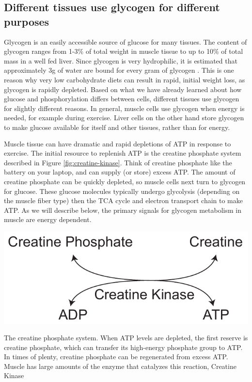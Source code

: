 \documentclass{tufte-handout}
\begin{document}
\subsection{Different tissues use glycogen for different purposes}

Glycogen is an easily accessible source of glucose for many tissues.  The content of glycogen ranges from 1-3\% of total weight in muscle tissue to up to 10\% of total mass in a well fed liver.  Since glycogen is very hydrophilic, it is estimated that approximately 3g of water are bound for every gram of glycogen \citep{Olsson1970,Fernandez-Elias2015}.  This is one reason why very low carbohydrate diets can result in rapid, initial weight loss, as glycogen is rapidly depleted. Based on what we have already learned about how glucose and phosphorylation differs between cells, different tissues use glycogen for slightly different reasons.  In general, muscle cells use glycogen when energy is needed, for example during exercise.  Liver cells on the other hand store glycogen to make glucose available for itself and other tissues, rather than for energy.

   Muscle tissue can have dramatic and rapid depletions of ATP in response to exercise.  The initial resource to replenish ATP is the creatine phosphate system described in Figure \ref{fig:creatine-kinase}.  Think of creatine phosphate like the battery on your laptop, and can supply (or store) excess ATP.  The amount of creatine phosphate can be quickly depleted, so muscle cells next turn to glycogen for glucose.  These glucose molecules typically undergo glycolysis (depending on the muscle fiber type) then the TCA cycle and electron transport chain to make ATP. As we will describe below, the primary signals for glycogen metabolism in muscle are energy dependent.

\begin{marginfigure}
\includegraphics{figures/creatine-kinase.pdf}
\caption{The creatine phosphate system.  When ATP levels are depleted, the first reserve is creatine phosphate, which can transfer its high-energy phosphate group to ATP.  In times of plenty, creatine phosphate can be regenerated from excess ATP.  Muscle has large amounts of the enzyme that catalyzes this reaction, Creatine Kinase}
\label{fig:creatine-kinase}
\end{marginfigure}
\end{document}
